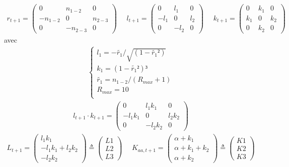 \begin{align*}
r_{t+1}= \begin{pmatrix}
0 & n_{1-2} & 0\\
-n_{1-2} & 0 & n_{2-3}\\
0 & -n_{2-3} & 0
\end{pmatrix}
~~~~~~
l_{t+1}= \begin{pmatrix}
0 & l_1 & 0\\
-l_1 & 0 & l_2\\
0 & -l_2 & 0
\end{pmatrix}
~~~~~~
k_{t+1}= \begin{pmatrix}
0 & k_1 & 0\\
k_1 & 0 & k_2\\
0 & k_2 & 0
\end{pmatrix}
\end{align*}
avec 
\begin{align*}
    \left\{
                \begin{array}{ll}
                  l_1= -\tilde{r_1}/\sqrt{(1-\tilde{r_1}²)} \\
                    k_1= (1-\tilde{r_1}²)³  \\
                    \tilde{r_1} = n_{1-2}/(R_{max}+1) \\
                    R_{max}=10 \\
                \end{array}
              \right.
\end{align*}
\begin{align*}
l_{t+1} \cdot k_{t+1}= \begin{pmatrix}
0 & l_1 k_1 & 0\\
-l_1 k_1 & 0 & l_2 k_2\\
0 & -l_2 k_2 & 0
\end{pmatrix}
\end{align*}
\begin{align*}
L_{t+1}= \begin{pmatrix}
l_1 k_1\\
-l_1 k_1 +l_2 k_2\\
-l_2 k_2
\end{pmatrix} \triangleq
\begin{pmatrix}
L1\\
L2\\
L3
\end{pmatrix} 
~~~~~~
K_{aa,t+1}= \begin{pmatrix}
\alpha + k_1\\
\alpha +  k_1 + k_2\\
\alpha + k_2
\end{pmatrix} \triangleq
\begin{pmatrix}
K1\\
K2\\
K3
\end{pmatrix} 
\end{align*}




